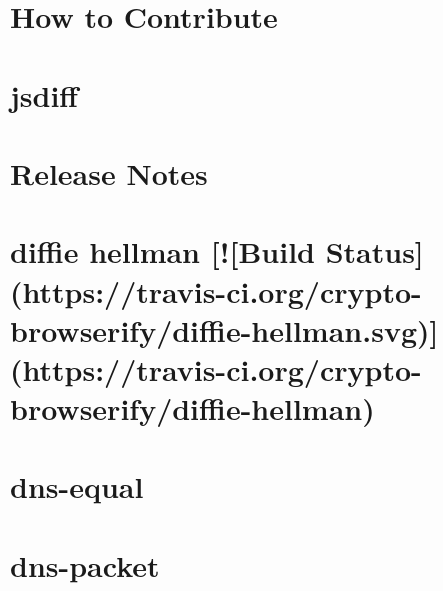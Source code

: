 \documentclass[twoside]{book}
\newcommand{\+}{\discretionary{\mbox{\scriptsize$\hookleftarrow$}}{}{}}
\begin{document}
\chapter{How to Contribute}
\label{md__c_1_workspace_demo_src_main_script_node_modules_diff__c_o_n_t_r_i_b_u_t_i_n_g}

\chapter{jsdiff}
\label{md__c_1_workspace_demo_src_main_script_node_modules_diff__r_e_a_d_m_e}

\chapter{Release Notes}
\label{md__c_1_workspace_demo_src_main_script_node_modules_diff_release-notes}

\chapter{diffie hellman \mbox{[}!\mbox{[}Build Status\mbox{]}(https\+://travis-\/ci.org/crypto-\/browserify/diffie-\/hellman.svg)\mbox{]}(https\+://travis-\/ci.org/crypto-\/browserify/diffie-\/hellman)}
\label{md__c_1_workspace_demo_src_main_script_node_modules_diffie-hellman_readme}

\chapter{dns-\/equal}
\label{md__c_1_workspace_demo_src_main_script_node_modules_dns-equal__r_e_a_d_m_e}

\chapter{dns-\/packet}
\label{md__c_1_workspace_demo_src_main_script_node_modules_dns-packet__r_e_a_d_m_e}

\end{document}
